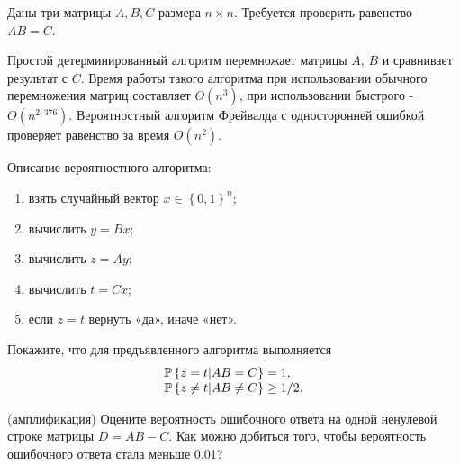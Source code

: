 \begin{problem}

Даны три матрицы $A,B,C$ размера $n\times n$. Требуется проверить равенство $AB=C$.

Простой детерминированный алгоритм перемножает матрицы $A$, $B$ и сравнивает результат с $C$. Время работы такого алгоритма при использовании обычного перемножения матриц составляет $O(n^{3} )$, при использовании быстрого - $O(n^{2,376} )$. Вероятностный алгоритм Фрейвалда с односторонней ошибкой проверяет равенство за время $O(n^{2} )$.

Описание вероятностного алгоритма:

\begin{enumerate}
\item \textbf{ }взять случайный вектор $x\in \left\{0,1\right\}^{n}; $

\item  вычислить $y=Bx;$

\item  вычислить $z=Ay;$

\item  вычислить $t=Cx;$

\item  если $z=t$ вернуть «да», иначе «нет».
\end{enumerate}
Покажите, что для предъявленного алгоритма выполняется 
\[\begin{array}{l} {\ensuremath{\mathrm{{\mathbb P}}}\left\{z=t \vert AB=C\right\}=1,} \\ {\mathrm{{\mathbb P}}\left\{z \neq t \vert AB\ne C\right\}\ge 1/2.} \end{array}\] 

\begin{remark} (амплификация)
Оцените вероятность ошибочного ответа на одной ненулевой строке матрицы $D = AB - C$. Как можно добиться того, чтобы вероятность ошибочного ответа стала меньше 0.01?
\end{remark}

\end{problem}


